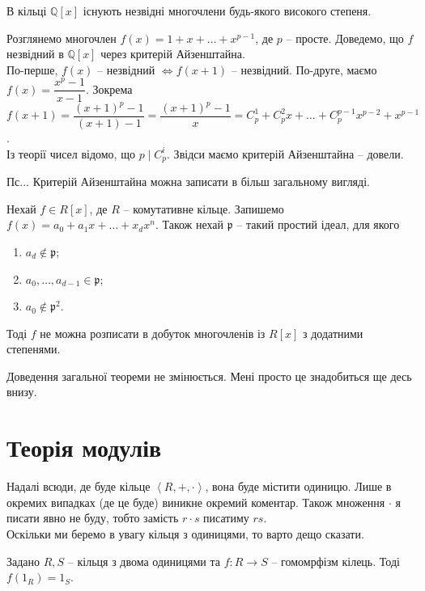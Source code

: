 \documentclass{math_library}
\begin{document}
\begin{corollary}
В кільці $\mathbb{Q}[x]$ існують незвідні многочлени будь-якого високого степеня.
\end{corollary}

\begin{example}
Розглянемо многочлен $f(x) = 1 + x + \dots + x^{p-1}$, де $p$ -- просте. Доведемо, що $f$ незвідний в $\mathbb{Q}[x]$ через критерій Айзенштайна.\\
По-перше, $f(x)$ -- незвідний $\iff f(x+1)$ -- незвідний. По-друге, маємо $f(x) = \dfrac{x^p-1}{x-1}$. Зокрема\\
$f(x+1) = \dfrac{(x+1)^p - 1}{(x+1)-1} = \dfrac{(x+1)^p - 1}{x} = C_p^1 + C_p^2 x + \dots + C_p^{p-1} x^{p-2} + x^{p-1}$.\\
Із теорії чисел відомо, що $p \mid C_p^{i}$. Звідси маємо критерій Айзенштайна -- довели. 
\end{example}

\begin{remark}
Пс... Критерій Айзенштайна можна записати в більш загальному вигляді.
\end{remark}

\begin{theorem}
Нехай $f \in R[x]$, де $R$ -- комутативне кільце. Запишемо $f(x) = a_0 + a_1 x + \dots + x_d x^n$. Також нехай $\mathfrak{p}$ -- такий простий ідеал, для якого
\begin{enumerate}[nosep,wide=0pt,label={\arabic*-}]
\item $a_d \notin \mathfrak{p}$;
\item $a_0,\dots,a_{d-1} \in \mathfrak{p}$;
\item $a_0 \notin \mathfrak{p}^2$.
\end{enumerate}
Тоді $f$ не можна розписати в добуток многочленів із $R[x]$ з додатними степенями.
\end{theorem}

Доведення загальної теореми не змінюється. Мені просто це знадобиться ще десь внизу.

\newpage
\fi

\iffalse
\section{Теорія модулів}
Надалі всюди, де буде кільце $\left< R,+,\cdot\right>$, вона буде містити одиницю. Лише в окремих випадках (де це буде) виникне окремий коментар. Також множення $\cdot$ я писати явно не буду, тобто замість $r \cdot s$ писатиму $rs$.
\bigskip \\
Оскільки ми беремо в увагу кільця з одиницями, то варто дещо сказати.
\begin{proposition}
Задано $R,S$ -- кільця з двома одиницями та $f \colon R \to S$ -- гомомрфізм кілець. Тоді $f(1_R) = 1_S$.
\end{proposition}
\end{document}
